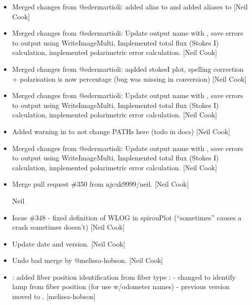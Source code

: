 \documentclass[a4paper,10pt,english]{report}
\begin{document}
\begin{itemize}
\item {} 
Merged changes from @edermartioli: added alias to 
and added aliases to  {[}Neil Cook{]}

\item {} 
Merged changes from @edermartioli: Update output name with , save
errors to output using WriteImageMulti, Implemented total flux (Stokes
I) calculation, implemented polarimetric error calculation. {[}Neil
Cook{]}

\item {} 
Merged changes from @edermartioli: aqdded stokesI plot, spelling
correction + polarisation is now percentage (bug was missing in
conversion) {[}Neil Cook{]}

\item {} 
Merged changes from @edermartioli: Update output name with , save
errors to output using WriteImageMulti, Implemented total flux (Stokes
I) calculation, implemented polarimetric error calculation. {[}Neil
Cook{]}

\item {} 
Added warning in  to not change PATHs here (todo in docs)
{[}Neil Cook{]}

\item {} 
Merged changes from @edermartioli: Update output name with , save
errors to output using WriteImageMulti, Implemented total flux (Stokes
I) calculation, implemented polarimetric error calculation. {[}Neil
Cook{]}

\item {} 
Merge pull request \#350 from njcuk9999/neil. {[}Neil Cook{]}

Neil

\item {} 
Issue \#348 - fixed definition of WLOG in spirouPlot (“sometimes”
causes a crash sometimes doesn’t) {[}Neil Cook{]}

\item {} 
Update date and version. {[}Neil Cook{]}

\item {} 
Undo bad merge by @melissa-hobson. {[}Neil Cook{]}

\item {} 
: added fiber position identification from fiber
type : - changed to identify lamp from
fiber position (for use w/odometer names) - previous version moved to
. {[}melissa-hobson{]}

\end{itemize}
\end{document}
